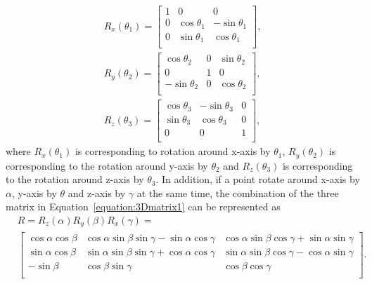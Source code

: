 \begin{equation}
\label{equation:3Dmatrix1}
\begin{aligned}
R_{x}(\theta_{1})=\begin{bmatrix}
1&          0&          0\\
0&\cos\theta_{1} & -\sin\theta_{1}\\
0&\sin\theta_{1} & \cos\theta_{1}\\
\end{bmatrix},
\\R_{y}(\theta_{2})=\begin{bmatrix}
  \cos\theta_{2}&          0&\sin\theta_{2}\\
           0&          1& 0\\
-\sin\theta_{2} &          0&\cos\theta_{2}\\
\end{bmatrix},
\\R_{z}(\theta_{3})=\begin{bmatrix}
\cos\theta_{3}&-\sin\theta_{3}&0\\
\sin\theta_{3}& \cos\theta_{3}&0\\
         0&          0&1\\
\end{bmatrix},
\end{aligned}
\end{equation}
where $R_{x}(\theta_{1})$ is corresponding to rotation around x-axis by $\theta_{1}$, $R_{y}(\theta_{2})$ is corresponding to the rotation around y-axis by $\theta_{2}$ and $R_{z}(\theta_{3})$ is corresponding to the rotation around z-axis by $\theta_{3}$. In addition, if a point rotate around x-axis by $\alpha$, y-axis by $\theta$ and z-axis by $\gamma$ at the same time, the combination of the three matrix in Equation~\ref{equation:3Dmatrix1} can be represented as
\begin{equation}
\label{equation:3Dmatrix2}
\begin{aligned}
&R=R_{z}(\alpha)R_{y}(\beta)R_{x}(\gamma)=\\
&\begin{bmatrix}
\cos\alpha\cos\beta&\cos\alpha\sin\beta\sin\gamma-\sin\alpha\cos\gamma&\cos\alpha\sin\beta\cos\gamma+\sin\alpha\sin\gamma\\
\sin\alpha\cos\beta&\sin\alpha\sin\beta\sin\gamma+\cos\alpha\cos\gamma&\sin\alpha\sin\beta\cos\gamma-\cos\alpha\sin\gamma\\
         -\sin\beta&                               \cos\beta\sin\gamma&\cos\beta\cos\gamma\\
\end{bmatrix}.
\end{aligned}
\end{equation}
